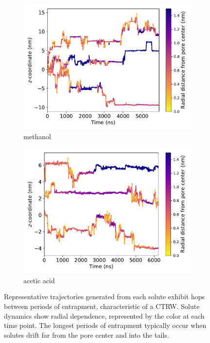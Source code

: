 \documentclass[aps,pre,preprint,groupedaddress,longbibliography]{revtex4-2}
\begin{document}
\begin{figure}
\begin{subfigure}{0.45\textwidth}
  \includegraphics[width=\textwidth]{MET_trajectories.pdf}
  \caption{methanol}\label{fig:MET_trajectories}
  \end{subfigure}
  \begin{subfigure}{0.45\textwidth}
  \includegraphics[width=\textwidth]{ACH_trajectories.pdf}
  \caption{acetic acid}\label{fig:ACH_trajectories}
  \end{subfigure}
  \caption{Representative trajectories generated from each solute exhibit hops 
  between periods of entrapment, characteristic of a CTRW. Solute dynamics show
  radial dependence, represented by the color at each time point. The longest 
  periods of entrapment typically occur when solutes drift far from the pore 
  center and into the tails.
  }\label{fig:solute_trajectories}
  \end{figure}
  
\end{document}
